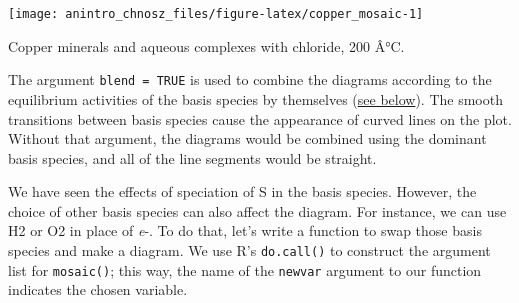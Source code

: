 \documentclass[]{tufte-handout}
\newenvironment{Shaded}{}{}
\newcommand{\KeywordTok}[1]{\textcolor[rgb]{0.00,0.44,0.13}{\textbf{#1}}}
\newcommand{\DataTypeTok}[1]{\textcolor[rgb]{0.56,0.13,0.00}{#1}}
\newcommand{\DecValTok}[1]{\textcolor[rgb]{0.25,0.63,0.44}{#1}}
\newcommand{\FloatTok}[1]{\textcolor[rgb]{0.25,0.63,0.44}{#1}}
\newcommand{\StringTok}[1]{\textcolor[rgb]{0.25,0.44,0.63}{#1}}
\newcommand{\OtherTok}[1]{\textcolor[rgb]{0.00,0.44,0.13}{#1}}
\newcommand{\OperatorTok}[1]{\textcolor[rgb]{0.40,0.40,0.40}{#1}}
\newcommand{\NormalTok}[1]{#1}
\begin{document}
\begin{marginfigure}
\texttt{[image: anintro\_chnosz\_files/figure-latex/copper\_mosaic-1]} \caption[Copper minerals and aqueous complexes with chloride, 200 Â°C]{Copper minerals and aqueous complexes with chloride, 200 Â°C.}\label{fig:copper_mosaic}
\end{marginfigure}

\begin{Shaded}
\end{Shaded}

The argument \texttt{blend\ =\ TRUE} is used to combine the diagrams
according to the equilibrium activities of the basis species by
themselves (\protect\hyperlink{equilibration}{see below}). The smooth
transitions between basis species cause the appearance of curved lines
on the plot. Without that argument, the diagrams would be combined using
the dominant basis species, and all of the line segments would be
straight.

 We have seen the effects of speciation of S in the basis species.
However, the choice of other basis species can also affect the diagram.
For instance, we can use H2 or O2 in place of \emph{e}-. To do that,
let's write a function to swap those basis species and make a diagram.
We use R's \texttt{do.call()} to construct the argument list for
{\texttt{mosaic()}}; this way, the name of the \texttt{newvar} argument
to our function indicates the chosen variable.
\end{document}
